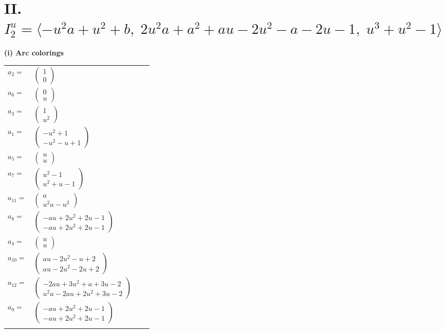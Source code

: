 \documentclass[1p]{elsarticle_modified}
\theoremstyle{definition}
\begin{document}
\centering \section*{II. $I^u_{2}= \langle - u^2 a+u^2+b,\;2 u^2 a+a^2+a u-2 u^2- a-2 u-1,\;u^3+u^2-1 \rangle$}
\flushleft \textbf{(i) Arc colorings}\\
\begin{tabular}{m{7pt} m{180pt} m{7pt} m{180pt} }
\flushright $a_{2}=$&$\begin{pmatrix}1\\0\end{pmatrix}$ \\
\flushright $a_{6}=$&$\begin{pmatrix}0\\u\end{pmatrix}$ \\
\flushright $a_{3}=$&$\begin{pmatrix}1\\u^2\end{pmatrix}$ \\
\flushright $a_{1}=$&$\begin{pmatrix}- u^2+1\\- u^2- u+1\end{pmatrix}$ \\
\flushright $a_{5}=$&$\begin{pmatrix}u\\u\end{pmatrix}$ \\
\flushright $a_{7}=$&$\begin{pmatrix}u^2-1\\u^2+u-1\end{pmatrix}$ \\
\flushright $a_{11}=$&$\begin{pmatrix}a\\u^2 a- u^2\end{pmatrix}$ \\
\flushright $a_{8}=$&$\begin{pmatrix}- a u+2 u^2+2 u-1\\- a u+2 u^2+2 u-1\end{pmatrix}$ \\
\flushright $a_{4}=$&$\begin{pmatrix}u\\u\end{pmatrix}$ \\
\flushright $a_{10}=$&$\begin{pmatrix}a u-2 u^2- u+2\\a u-2 u^2-2 u+2\end{pmatrix}$ \\
\flushright $a_{12}=$&$\begin{pmatrix}-2 a u+3 u^2+a+3 u-2\\u^2 a-2 a u+2 u^2+3 u-2\end{pmatrix}$ \\
\flushright $a_{9}=$&$\begin{pmatrix}- a u+2 u^2+2 u-1\\- a u+2 u^2+2 u-1\end{pmatrix}$\\&\end{tabular}
\end{document}
